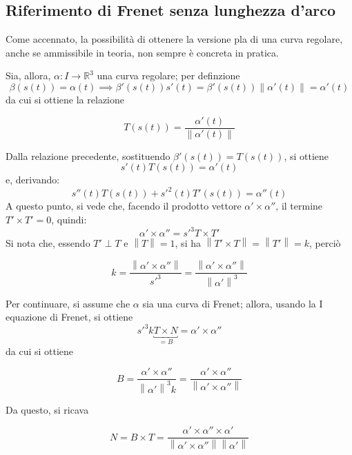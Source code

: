 \documentclass[12pt]{article}
\theoremstyle{style}
\newenvironment{boxenv}[1][]{
    \begin{eqbox}[#1]
    }{
   \end{eqbox}
}
\numberwithin{equation}{subsection}
\begin{document}
\subsection{Riferimento di Frenet senza lunghezza d'arco}
Come accennato, la possibilit\`a di ottenere la versione pla di una curva regolare, anche se ammissibile in teoria, non sempre \`e concreta in pratica.

Sia, allora, $\alpha : I \to \mathbb{R}^3$ una curva regolare; per definzione
\[
	\beta (s(t))= \alpha (t) \implies \beta '(s(t)) s'(t) = \beta '(s(t)) \left\lVert \alpha '(t) \right\rVert = \alpha '(t)
\] 
da cui si ottiene la relazione
\begin{boxenv}[]
\[
	T(s(t)) = \frac{\alpha '(t)}{\left\lVert \alpha '(t) \right\rVert }
\] 
\end{boxenv}
\noindent Dalla relazione precedente, sostituendo $\beta '(s(t)) = T(s(t))$, si ottiene
\begin{equation}
	s'(t) T(s(t)) = \alpha '(t)
\end{equation}
e, derivando:
\begin{equation}\label{e1}
s'' (t) T(s(t)) + s'^2(t) T'(s(t)) = \alpha ''(t)
\end{equation}
A questo punto, si vede che, facendo il prodotto vettore $\alpha ' \times \alpha ''$, il termine $T' \times T' = 0$, quindi:
\begin{equation}\label{e2}
	\alpha ' \times \alpha '' = s'^3 T\times T'
\end{equation}
Si nota che, essendo $T ' \perp T $ e $\left\lVert T \right\rVert = 1$, si ha $\left\lVert T ' \times T \right\rVert = \left\lVert T' \right\rVert = k$, perci\`o
\begin{boxenv}[]
\[
k = \frac{\left\lVert \alpha '\times \alpha '' \right\rVert }{s'^3}= \frac{\left\lVert \alpha ' \times \alpha ''\right\rVert }{\left\lVert \alpha '\right\rVert ^3}
\] 
\end{boxenv}
\noindent Per continuare, si assume che $\alpha $ sia una curva di Frenet; allora, usando la I equazione di Frenet, si ottiene
\[
	s'^3 k \underbracket{T \times N }_{=B} = \alpha ' \times \alpha ''
\] 
da cui si ottiene
\begin{boxenv}[]
\[
B=\frac{\alpha '\times \alpha ''}{\left\lVert \alpha ' \right\rVert ^3 k} =\frac{\alpha ' \times \alpha ''}{\left\lVert \alpha ' \times \alpha '' \right\rVert }
\] 
\end{boxenv}
\noindent Da questo, si ricava 
\begin{boxenv}[]
\[
N = B \times T = \frac{\alpha ' \times \alpha '' \times \alpha '}{\left\lVert \alpha '\times \alpha '' \right\rVert \left\lVert \alpha ' \right\rVert }
\] 
\end{boxenv}
\end{document}
